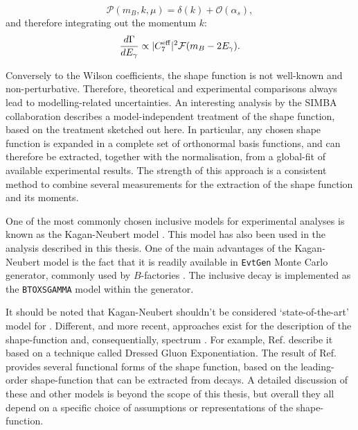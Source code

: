 \begin{equation}
    \mathcal{P}(m_B,k,\mu) = \delta(k) + \mathcal{O}(\alpha_s),
\end{equation}
and therefore integrating out the momentum $k$:
\begin{equation}
    \frac{d\Gamma}{d{E_{\gamma}}} \propto |C_7^{\mathrm{eff}}|^2 \mathcal{F}(m_B-2{E_{\gamma}}).
\end{equation}

Conversely to the Wilson coefficients, the shape function is not well-known and non-perturbative.
Therefore, theoretical and experimental comparisons always lead to modelling-related uncertainties.
An interesting analysis by the SIMBA collaboration \cite{Bernlochner:2020jlt} describes a model-independent treatment of the shape function, based on the treatment sketched out here.
In particular, any chosen shape function is expanded in a complete set of orthonormal basis functions, and can therefore be extracted, together with the normalisation, from a global-fit of available experimental results.
The strength of this approach is a consistent method to combine several measurements for the extraction of the shape function and its moments.


One of the most commonly chosen inclusive \BtoXsgamma models for experimental analyses is known as the Kagan-Neubert model \cite{Kagan:1998ym}.
This model has also been used in the analysis described in this thesis.
One of the main advantages of the Kagan-Neubert model is the fact that it is readily available in \texttt{EvtGen} Monte Carlo generator, commonly used by $B$-factories \cite{Ryd:2005zz}.
The \BtoXsgamma inclusive decay is implemented as the \texttt{BTOXSGAMMA} model within the generator. 

It should be noted that Kagan-Neubert shouldn't be considered `state-of-the-art' model for \BtoXsgamma. 
Different, and more recent, approaches exist for the description of the shape-function and, consequentially, \BtoXsgamma spectrum \cite{Benson:2004sg,Lange:2005yw,Andersen:2005mj,Gambino:2007rp,Aglietti:2007ik}.
For example, Ref. \cite{Andersen:2005mj} describe it based on a technique called Dressed Gluon Exponentiation.
The result of Ref. \cite{Lange:2005yw} provides several functional forms of the shape function, based on the leading-order shape-function that can be extracted from \BtoXsgamma decays.
A detailed discussion of these and other models is beyond the scope of this thesis, but overall they all depend on a specific choice of assumptions or representations of the shape-function.





